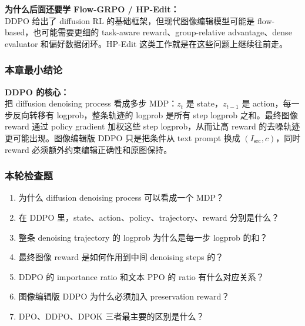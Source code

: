 \begin{warnbox}
\textbf{为什么后面还要学 Flow-GRPO / HP-Edit：}\\
DDPO 给出了 diffusion RL 的基础框架，但现代图像编辑模型可能是 flow-based，也可能需要更细的 task-aware reward、group-relative advantage、dense evaluator 和偏好数据闭环。HP-Edit 这类工作就是在这些问题上继续往前走。
\end{warnbox}

\subsubsection{本章最小结论}

\begin{summarybox}
\textbf{DDPO 的核心：}\\
把 diffusion denoising process 看成多步 MDP：$z_t$ 是 state，$z_{t-1}$ 是 action，每一步反向转移有 logprob，整条轨迹的 logprob 是所有 step logprob 之和。最终图像 reward 通过 policy gradient 加权这些 step logprob，从而让高 reward 的去噪轨迹更可能出现。图像编辑版 DDPO 只是把条件从 text prompt 换成 $(I_\text{src},c)$，同时 reward 必须额外约束编辑正确性和原图保持。
\end{summarybox}

\subsubsection{本轮检查题}

\begin{enumerate}[leftmargin=1.5em]
  \item 为什么 diffusion denoising process 可以看成一个 MDP？
  \item 在 DDPO 里，state、action、policy、trajectory、reward 分别是什么？
  \item 整条 denoising trajectory 的 logprob 为什么是每一步 logprob 的和？
  \item 最终图像 reward 是如何作用到中间 denoising steps 的？
  \item DDPO 的 importance ratio 和文本 PPO 的 ratio 有什么对应关系？
  \item 图像编辑版 DDPO 为什么必须加入 preservation reward？
  \item DPO、DDPO、DPOK 三者最主要的区别是什么？
\end{enumerate}
